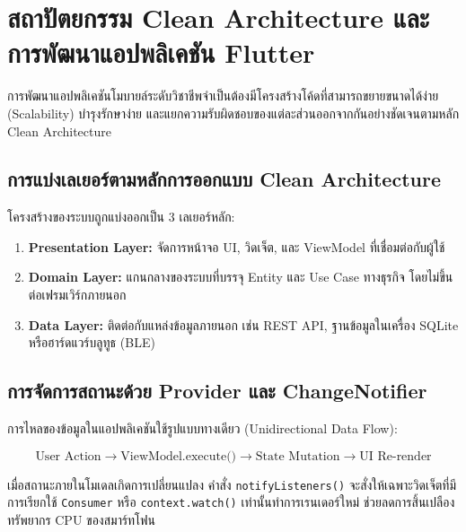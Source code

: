 \chapter{สถาปัตยกรรม Clean Architecture และการพัฒนาแอปพลิเคชัน Flutter}

การพัฒนาแอปพลิเคชันโมบายล์ระดับวิชาชีพจำเป็นต้องมีโครงสร้างโค้ดที่สามารถขยายขนาดได้ง่าย (Scalability) บำรุงรักษาง่าย และแยกความรับผิดชอบของแต่ละส่วนออกจากกันอย่างชัดเจนตามหลัก Clean Architecture

\section{การแบ่งเลเยอร์ตามหลักการออกแบบ Clean Architecture}

โครงสร้างของระบบถูกแบ่งออกเป็น 3 เลเยอร์หลัก:
\begin{enumerate}
    \item \textbf{Presentation Layer:} จัดการหน้าจอ UI, วิดเจ็ต, และ ViewModel ที่เชื่อมต่อกับผู้ใช้
    \item \textbf{Domain Layer:} แกนกลางของระบบที่บรรจุ Entity และ Use Case ทางธุรกิจ โดยไม่ขึ้นต่อเฟรมเวิร์กภายนอก
    \item \textbf{Data Layer:} ติดต่อกับแหล่งข้อมูลภายนอก เช่น REST API, ฐานข้อมูลในเครื่อง SQLite หรือฮาร์ดแวร์บลูทูธ (BLE)
\end{enumerate}

\section{การจัดการสถานะด้วย Provider และ ChangeNotifier}

การไหลของข้อมูลในแอปพลิเคชันใช้รูปแบบทางเดียว (Unidirectional Data Flow):

\begin{equation}
\text{User Action} \longrightarrow \text{ViewModel.execute()} \longrightarrow \text{State Mutation} \longrightarrow \text{UI Re-render}
\end{equation}

เมื่อสถานะภายในโมเดลเกิดการเปลี่ยนแปลง คำสั่ง \texttt{notifyListeners()} จะสั่งให้เฉพาะวิดเจ็ตที่มีการเรียกใช้ \texttt{Consumer} หรือ \texttt{context.watch()} เท่านั้นทำการเรนเดอร์ใหม่ ช่วยลดการสิ้นเปลืองทรัพยากร CPU ของสมาร์ทโฟน
